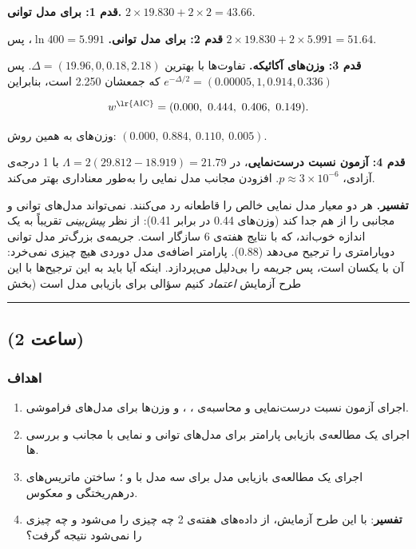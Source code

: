 \textbf{قدم 1:  برای مدل توانی.}
\(2 \times 19.830 + 2 \times 2 = 43.66\).

\textbf{قدم 2:  برای مدل توانی.} \(\ln 400 = 5.991\)، پس
\(2 \times 19.830 + 2 \times 5.991 = 51.64\).

\textbf{قدم 3: وزن‌های آکائیکه.} تفاوت‌ها با بهترین 
\(\Delta = (19.96, 0, 0.18, 2.18)\). پس
\(e^{-\Delta/2} = (0.00005,\allowbreak 1,\allowbreak 0.914,\allowbreak 0.336)\) که جمعشان 2.250 است،
بنابراین

\[
w^{\text{\lr{AIC}}} = (0.000,\ 0.444,\ 0.406,\ 0.149).
\]

وزن‌های  به همین روش: \((0.000,\ 0.884,\ 0.110,\ 0.005)\).

\textbf{قدم 4: آزمون نسبت درست‌نمایی}،  در 
\(\Lambda = 2(29.812 - 18.919) = 21.79\) با 1 درجه‌ی آزادی،
\(p \approx 3 \times 10^{-6}\). افزودن مجانب مدل نمایی را به‌طور معناداری
بهتر می‌کند.

\textbf{تفسیر.} هر دو معیار مدل نمایی خالص را قاطعانه رد می‌کنند.
 نمی‌تواند مدل‌های توانی و مجانبی را از هم جدا کند (وزن‌های 0.44 در
برابر 0.41): از نظر \emph{پیش‌بینی} تقریباً به یک اندازه خوب‌اند، که با
نتایج  هفته‌ی 6 سازگار است. جریمه‌ی بزرگ‌تر  مدل توانی
دوپارامتری را ترجیح می‌دهد (0.88). پارامتر اضافه‌ی مدل دوردی هیچ چیزی
نمی‌خرد:  آن با  یکسان است، پس جریمه را بی‌دلیل
می‌پردازد. اینکه آیا باید به این ترجیح‌ها با این طرح آزمایش \emph{اعتماد}
کنیم سؤالی برای بازیابی مدل است (بخش 

\begin{center}\rule{0.5\linewidth}{0.5pt}\end{center}


\subsection{\texorpdfstring{ (2 ساعت)}{lab (2 ساعت)}}

\subsubsection{اهداف}

\begin{enumerate}
\def\labelenumi{\arabic{enumi}.}
\tightlist
\item
  اجرای آزمون نسبت درست‌نمایی و محاسبه‌ی ، ،  و
  وزن‌ها برای مدل‌های فراموشی.
\item
  اجرای یک مطالعه‌ی بازیابی پارامتر برای مدل‌های توانی و نمایی با مجانب و
  بررسی ها.
\item
  اجرای یک مطالعه‌ی بازیابی مدل برای سه مدل با  و ؛ ساختن
  ماتریس‌های درهم‌ریختگی و معکوس.
\item
  \textbf{تفسیر}: با این طرح آزمایش، از داده‌های هفته‌ی 2 چه چیزی را می‌شود
  و چه چیزی را نمی‌شود نتیجه گرفت؟
\end{enumerate}

